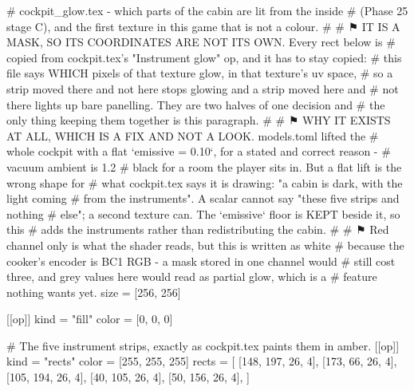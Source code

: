 # cockpit_glow.tex - which parts of the cabin are lit from the inside
# (Phase 25 stage C), and the first texture in this game that is not a colour.
#
# ⚑ IT IS A MASK, SO ITS COORDINATES ARE NOT ITS OWN. Every rect below is
# copied from cockpit.tex's "Instrument glow" op, and it has to stay copied:
# this file says WHICH pixels of that texture glow, in that texture's uv space,
# so a strip moved there and not here stops glowing and a strip moved here and
# not there lights up bare panelling. They are two halves of one decision and
# the only thing keeping them together is this paragraph.
#
# ⚑ WHY IT EXISTS AT ALL, WHICH IS A FIX AND NOT A LOOK. models.toml lifted the
# whole cockpit with a flat `emissive = 0.10`, for a stated and correct reason -
# vacuum ambient is 1.2%
# black for a room the player sits in. But a flat lift is the wrong shape for
# what cockpit.tex says it is drawing: "a cabin is dark, with the light coming
# from the instruments". A scalar cannot say "these five strips and nothing
# else"; a second texture can. The `emissive` floor is KEPT beside it, so this
# adds the instruments rather than redistributing the cabin.
#
# ⚑ Red channel only is what the shader reads, but this is written as white
# because the cooker's encoder is BC1 RGB - a mask stored in one channel would
# still cost three, and grey values here would read as partial glow, which is a
# feature nothing wants yet.
size = [256, 256]

[[op]]
kind = "fill"
color = [0, 0, 0]

# The five instrument strips, exactly as cockpit.tex paints them in amber.
[[op]]
kind = "rects"
color = [255, 255, 255]
rects = [
  [148, 197, 26, 4],
  [173, 66, 26, 4],
  [105, 194, 26, 4],
  [40, 105, 26, 4],
  [50, 156, 26, 4],
]
